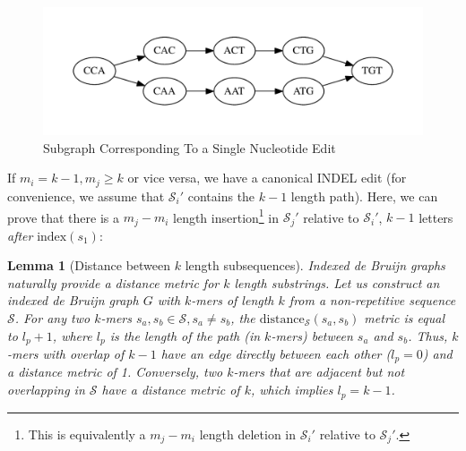 \documentclass{bioinfo}
\newtheorem{lemma}{Lemma}
\begin{document}
\begin{methods}
\begin{figure}[h]
\begin{center}
\includegraphics[width=0.95\linewidth, clip=true, trim=0 39 0 39]{graphs/sne.pdf}
\end{center}
\caption{Subgraph Corresponding To a Single Nucleotide Edit}
\label{fig:sne}
\end{figure}

If $m_i = k - 1, m_j \ge k$ or vice versa, we have a canonical INDEL edit (for convenience, we assume
that $\mathcal{S}_i'$ contains the $k - 1$ length path). Here, we can prove that there is a $m_j - m_i$
length insertion\footnote{This is equivalently a $m_j - m_i$ length deletion in $\mathcal{S}_i'$ relative to
$\mathcal{S}_j'$.} in $\mathcal{S}_j'$ relative to $\mathcal{S}_i'$, $k - 1$ letters \emph{after}
$\text{index}(s_1)$:

\begin{lemma}[Distance between $k$ length subsequences]
\label{lem:minimum-distance}
\emph{Indexed de Bruijn} graphs naturally provide a distance metric for $k$ length substrings. Let us construct an
indexed de Bruijn graph $G$ with $k$-mers of length $k$ from a non-repetitive sequence $\mathcal{S}$.
For any two $k$-mers $s_a, s_b \in \mathcal{S}, s_a \ne s_b$, the
$\text{distance}_\mathcal{S}(s_a, s_b)$ metric is equal to $l_p + 1$, where $l_p$ is the length of the
path (in $k$-mers) between $s_a$ and $s_b$. Thus, $k$-mers with overlap of $k - 1$ have an edge
directly between each other ($l_p = 0$) and a distance metric of 1. Conversely, two $k$-mers that are
adjacent but not overlapping in $\mathcal{S}$ have a distance metric of $k$, which implies $l_p = k - 1$.
\end{lemma}


\end{methods}
\end{document}
